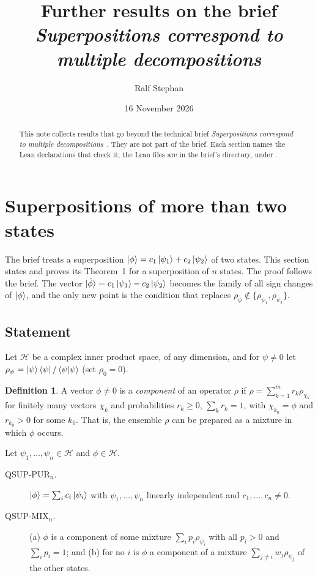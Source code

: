 \documentclass[11pt]{article}
\title{Further results on the brief\\ \emph{Superpositions correspond to multiple decompositions}}
\author{Ralf Stephan}
\date{16 November 2026}
\theoremstyle{definition}
\newtheorem{definition}[theorem]{Definition}
\theoremstyle{remark}
\begin{document}
\maketitle

\begin{abstract}
  This note collects results that go beyond the technical brief \emph{Superpositions correspond
  to multiple decompositions}~\cite{brief}. They are not part of the brief. Each section names
  the Lean declarations that check it; the Lean files are in the brief's directory, under
  .
\end{abstract}

\section{Superpositions of more than two states}
\label{sec:many}

The brief treats a superposition $\ket\phi = c_1\ket{\psi_1} + c_2\ket{\psi_2}$ of two states.
This section states and proves its Theorem~1 for a superposition of $n$ states. The proof
follows the brief. The vector $\ket{\hat\phi} = c_1\ket{\psi_1} - c_2\ket{\psi_2}$ becomes the
family of all sign changes of $\ket\phi$, and the only new point is the condition that replaces
$\rho_\phi \notin \{\rho_{\psi_1}, \rho_{\psi_2}\}$.

\subsection{Statement}

Let $\mathcal H$ be a complex inner product space, of any dimension, and for $\psi \ne 0$ let
$\rho_\psi = \ket\psi\bra\psi / \braket{\psi|\psi}$ (set $\rho_0 = 0$).

\begin{definition}
  A vector $\phi \ne 0$ is a \emph{component} of an operator $\rho$ if $\rho = \sum_{k=1}^m r_k
  \rho_{\chi_k}$ for finitely many vectors $\chi_k$ and probabilities $r_k \ge 0$,
  $\sum_k r_k = 1$, with $\chi_{k_0} = \phi$ and $r_{k_0} > 0$ for some $k_0$. That is, the
  ensemble $\rho$ can be prepared as a mixture in which $\phi$ occurs.
\end{definition}

Let $\psi_1, \dots, \psi_n \in \mathcal H$ and $\phi \in \mathcal H$.
\begin{description}
\item[QSUP-PUR$_n$.] $\ket\phi = \sum_i c_i\ket{\psi_i}$ with $\psi_1, \dots, \psi_n$ linearly
  independent and $c_1, \dots, c_n \ne 0$.
\item[QSUP-MIX$_n$.] (a) $\phi$ is a component of some mixture $\sum_i p_i\rho_{\psi_i}$ with
  all $p_i > 0$ and $\sum_i p_i = 1$; and (b) for no $i$ is $\phi$ a component of a mixture
  $\sum_{j \ne i} w_j\rho_{\psi_j}$ of the other states.
\end{description}
\end{document}
